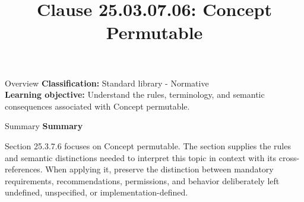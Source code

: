 \documentclass[10pt,letterpaper]{article}
\title{Clause 25.03.07.06: Concept Permutable}
\author{}
\date{}
\begin{document}
\maketitle
\begin{CornellOverviewBox}{Overview}
\textbf{Classification:} Standard library - Normative\\[2pt]
\textbf{Learning objective:} Understand the rules, terminology, and semantic consequences associated with Concept permutable.
\end{CornellOverviewBox}\begin{CornellSummaryBox}{Summary}
{\sffamily\bfseries\color{Accent} Summary}\par\vspace{3pt}Section 25.3.7.6 focuses on Concept permutable. The section supplies the rules and semantic distinctions needed to interpret this topic in context with its cross-references. When applying it, preserve the distinction between mandatory requirements, recommendations, permissions, and behavior deliberately left undefined, unspecified, or implementation-defined.
\end{CornellSummaryBox}
\end{document}
